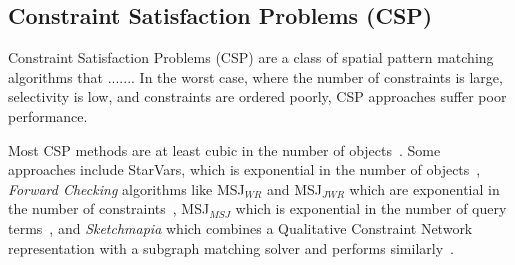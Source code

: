\subsection{Constraint Satisfaction Problems (CSP)}
    

    \par{
    Constraint Satisfaction Problems (CSP) are a class of spatial pattern matching algorithms that ....... 
    In the worst case, where the number of constraints is large, selectivity is low, and constraints are ordered poorly, CSP approaches suffer poor performance. 
    
    Most CSP methods are at least cubic in the number of objects~\cite{Dylla2017}.
    Some approaches include StarVars, which is exponential in the number of objects~\cite{Lee2013}, \textit{Forward Checking} algorithms like MSJ$_{WR}$ and MSJ$_{JWR}$ which are exponential in the number of constraints~\cite{Papadias1998}, MSJ$_{MSJ}$ which is exponential in the number of query terms~\cite{Papadias1998}, and \textit{Sketchmapia} which combines a Qualitative Constraint Network representation with a subgraph matching solver and performs similarly~\cite{Schwering2014,Jan2015}.

}
